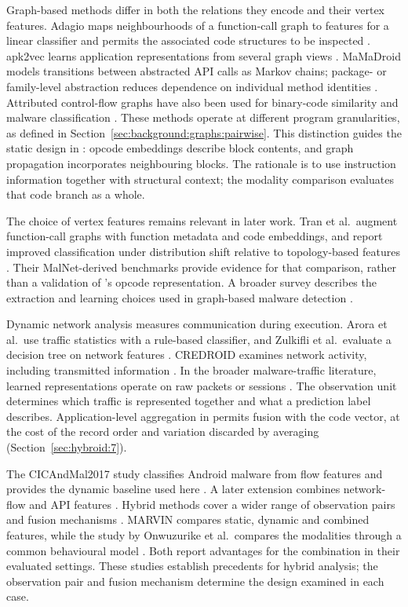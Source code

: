 Graph-based methods differ in both the relations they encode and their vertex features. Adagio
maps neighbourhoods of a function-call graph to features for a linear classifier and permits
the associated code structures to be inspected \cite{gascon2013structural}. apk2vec learns
application representations from several graph views \cite{narayanan2018apk2vec}. MaMaDroid
models transitions between abstracted API calls as Markov chains; package- or family-level
abstraction reduces dependence on individual method identities \cite{onwuzurike2019mamadroid}.
Attributed control-flow graphs have also been used for binary-code similarity and malware
classification \cite{xu2017neural, yan2019classifying}. These methods operate at different
program granularities, as defined in Section~\ref{sec:background:graphs:pairwise}. This distinction
guides the static design in \hybroid{}: opcode embeddings describe block contents, and graph
propagation incorporates neighbouring blocks. The rationale is to use instruction information
together with structural context; the modality comparison evaluates that code branch as a whole.

The choice of vertex features remains relevant in later work. Tran et al.\ augment function-call
graphs with function metadata and code embeddings, and report improved classification under
distribution shift relative to topology-based features \cite{tran2025quantifying}. Their
MalNet-derived benchmarks provide evidence for that comparison, rather than a validation of
\hybroid{}'s opcode representation. A broader survey describes the extraction and learning
choices used in graph-based malware detection \cite{bilot2024survey}.

Dynamic network analysis measures communication during execution. Arora et al.\ use traffic
statistics with a rule-based classifier, and Zulkifli et al.\ evaluate a decision tree on network
features \cite{arora2014malware, zulkifli2018android}. CREDROID examines network activity,
including transmitted information \cite{malik2016credroid}. In the broader malware-traffic
literature, learned representations operate on raw packets or sessions
\cite{marin2021deepmal, wang2017malware}. The observation unit determines which traffic is
represented together and what a prediction label describes. Application-level aggregation in
\hybroid{} permits fusion with the code vector, at the cost of the record order and variation
discarded by averaging (Section~\ref{sec:hybroid:7}).

The CICAndMal2017 study classifies Android malware from flow features and provides the dynamic
baseline used here \cite{lashkari2018toward}. A later extension combines network-flow and API
features \cite{taheri2019extensible}. Hybrid methods cover a wider range of observation pairs
and fusion mechanisms \cite{jain2026hybrid}. MARVIN compares static, dynamic and combined
features, while the study by Onwuzurike et al.\ compares the modalities through a common
behavioural model \cite{lindorfer2015marvin, onwuzurike2018family}. Both report advantages for
the combination in their evaluated settings. These studies establish precedents for hybrid
analysis; the observation pair and fusion mechanism determine the design examined in each case.

